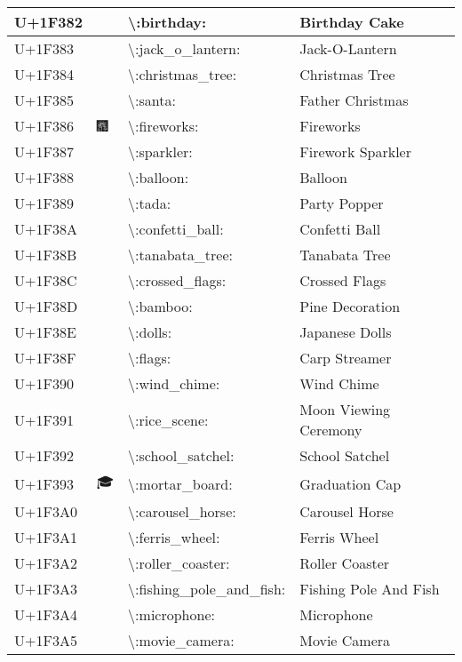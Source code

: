 \begin{table}[h]
\begin{tabulary}{\linewidth}{|L|L|L|L|}
\hline
U+1F382 & 🎂 & {\textbackslash}:birthday: & Birthday Cake \\
\hline
U+1F383 & 🎃 & {\textbackslash}:jack\_o\_lantern: & Jack-O-Lantern \\
\hline
U+1F384 & 🎄 & {\textbackslash}:christmas\_tree: & Christmas Tree \\
\hline
U+1F385 & 🎅 & {\textbackslash}:santa: & Father Christmas \\
\hline
U+1F386 & 🎆 & {\textbackslash}:fireworks: & Fireworks \\
\hline
U+1F387 & 🎇 & {\textbackslash}:sparkler: & Firework Sparkler \\
\hline
U+1F388 & 🎈 & {\textbackslash}:balloon: & Balloon \\
\hline
U+1F389 & 🎉 & {\textbackslash}:tada: & Party Popper \\
\hline
U+1F38A & 🎊 & {\textbackslash}:confetti\_ball: & Confetti Ball \\
\hline
U+1F38B & 🎋 & {\textbackslash}:tanabata\_tree: & Tanabata Tree \\
\hline
U+1F38C & 🎌 & {\textbackslash}:crossed\_flags: & Crossed Flags \\
\hline
U+1F38D & 🎍 & {\textbackslash}:bamboo: & Pine Decoration \\
\hline
U+1F38E & 🎎 & {\textbackslash}:dolls: & Japanese Dolls \\
\hline
U+1F38F & 🎏 & {\textbackslash}:flags: & Carp Streamer \\
\hline
U+1F390 & 🎐 & {\textbackslash}:wind\_chime: & Wind Chime \\
\hline
U+1F391 & 🎑 & {\textbackslash}:rice\_scene: & Moon Viewing Ceremony \\
\hline
U+1F392 & 🎒 & {\textbackslash}:school\_satchel: & School Satchel \\
\hline
U+1F393 & 🎓 & {\textbackslash}:mortar\_board: & Graduation Cap \\
\hline
U+1F3A0 & 🎠 & {\textbackslash}:carousel\_horse: & Carousel Horse \\
\hline
U+1F3A1 & 🎡 & {\textbackslash}:ferris\_wheel: & Ferris Wheel \\
\hline
U+1F3A2 & 🎢 & {\textbackslash}:roller\_coaster: & Roller Coaster \\
\hline
U+1F3A3 & 🎣 & {\textbackslash}:fishing\_pole\_and\_fish: & Fishing Pole And Fish \\
\hline
U+1F3A4 & 🎤 & {\textbackslash}:microphone: & Microphone \\
\hline
U+1F3A5 & 🎥 & {\textbackslash}:movie\_camera: & Movie Camera \\

\end{tabulary}
\end{table}
